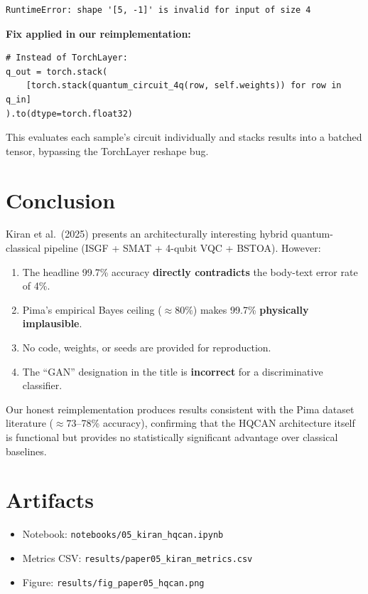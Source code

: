 \documentclass[12pt,a4paper]{article}
\begin{document}
\begin{verbatim}
RuntimeError: shape '[5, -1]' is invalid for input of size 4
\end{verbatim}

\noindent\textbf{Fix applied in our reimplementation:}
\begin{verbatim}
# Instead of TorchLayer:
q_out = torch.stack(
    [torch.stack(quantum_circuit_4q(row, self.weights)) for row in q_in]
).to(dtype=torch.float32)
\end{verbatim}
This evaluates each sample's circuit individually and stacks results into a batched tensor, bypassing the TorchLayer reshape bug.

\section{Conclusion}
Kiran et al.\ (2025) presents an architecturally interesting hybrid quantum-classical pipeline (ISGF + SMAT + 4-qubit VQC + BSTOA). However:
\begin{enumerate}
  \item The headline 99.7\% accuracy \textbf{directly contradicts} the body-text error rate of 4\%.
  \item Pima's empirical Bayes ceiling ($\approx 80\%$) makes 99.7\% \textbf{physically implausible}.
  \item No code, weights, or seeds are provided for reproduction.
  \item The ``GAN'' designation in the title is \textbf{incorrect} for a discriminative classifier.
\end{enumerate}
Our honest reimplementation produces results consistent with the Pima dataset literature ($\approx 73$--78\% accuracy), confirming that the HQCAN architecture itself is functional but provides no statistically significant advantage over classical baselines.

\appendix
\section{Artifacts}
\begin{itemize}
  \item Notebook: \texttt{notebooks/05\_kiran\_hqcan.ipynb}
  \item Metrics CSV: \texttt{results/paper05\_kiran\_metrics.csv}
  \item Figure: \texttt{results/fig\_paper05\_hqcan.png}
\end{itemize}
\end{document}
